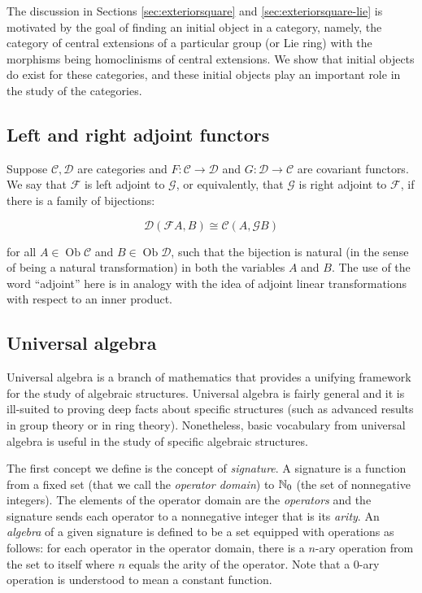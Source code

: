The discussion in Sections \ref{sec:exteriorsquare} and
\ref{sec:exteriorsquare-lie} is motivated by the goal of finding an
initial object in a category, namely, the category of central
extensions of a particular group (or Lie ring) with the morphisms
being homoclinisms of central extensions. We show that initial objects
do exist for these categories, and these initial objects play an
important role in the study of the categories.

\subsection{Left and right adjoint functors}\label{appsec:adjoint}

Suppose $\mathcal{C},\mathcal{D}$ are categories and $F:\mathcal{C}
\to \mathcal{D}$ and $G:\mathcal{D} \to \mathcal{C}$ are covariant
functors. We say that $\mathcal{F}$ is left adjoint to $\mathcal{G}$,
or equivalently, that $\mathcal{G}$ is right adjoint to $\mathcal{F}$,
if there is a family of bijections:

$$\mathcal{D}(\mathcal{F} A, B) \cong \mathcal{C}(A, \mathcal{G}B)$$

for all $A \in \operatorname{Ob} \mathcal{C}$ and $B \in
\operatorname{Ob} \mathcal{D}$, such that the bijection is natural (in
the sense of being a natural transformation) in both the variables $A$
and $B$. The use of the word ``adjoint'' here is in analogy with the
idea of adjoint linear transformations with respect to an inner
product.

\subsection{Universal algebra}\label{appsec:univalg-basic}

Universal algebra is a branch of mathematics that provides a
unifying framework for the study of algebraic structures. Universal
algebra is fairly general and it is ill-suited to proving deep facts
about specific structures (such as advanced results in group theory or
in ring theory). Nonetheless, basic vocabulary from universal algebra
is useful in the study of specific algebraic structures.

The first concept we define is the concept of {\em signature}. A
signature is a function from a fixed set (that we call the {\em
  operator domain}) to $\mathbb{N}_0$ (the set of nonnegative integers). The
elements of the operator domain are the {\em operators} and the
signature sends each operator to a nonnegative integer that is its
{\em arity}. An {\em algebra} of a given signature is defined to be a
set equipped with operations as follows: for each operator in the
operator domain, there is a $n$-ary operation from the set to itself
where $n$ equals the arity of the operator. Note that a $0$-ary
operation is understood to mean a constant function.

